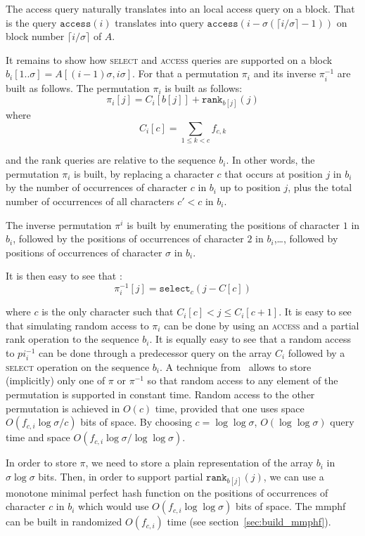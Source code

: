 \documentclass[a4paper]{article}
\begin{document}
The access query naturally translates into an local access query on a block. 
That is the query $\mathtt{access}(i)$ translates into query $\mathtt{access}(i-\sigma(\lceil i/\sigma\rceil-1))$ on block number $\lceil i/\sigma\rceil$ of $A$. 

It remains to show how \textsc{select} and \textsc{access} queries are supported on a block $b_i[1..\sigma]=A[(i-1)\sigma,i\sigma]$. For that a permutation $\pi_i$ and its inverse $\pi_i^{-1}$ are built as follows. The permutation $\pi_i$ is built as follows: $$\pi_i[j]=C_i[b[j]]+\mathtt{rank}_{b[j]}(j)$$ 
where $$C_i[c]=\sum_{1\leq k<c}{f_{c,k}}$$

and the rank queries are relative to the sequence $b_i$. In other words, the permutation $\pi_i$ is built, by replacing 
a character $c$ that occurs at position $j$ in $b_i$ by the number of occurrences of character $c$ in $b_i$ up to position $j$, 
plus the total number of occurrences of all characters $c'<c$ in $b_i$. 

The inverse permutation $\pi^{i}$ is built by enumerating the positions of character $1$ in $b_i$, followed by the positions 
of occurrences of character $2$ in $b_i$,\ldots, followed by positions of occurrences of character $\sigma$ in $b_i$. 

It is then easy to see that :
$$\pi^{-1}_i[j]=\mathtt{select}_{c}(j-C[c])$$ 

where $c$ is the only character such that $C_i[c]<j\leq C_i[c+1]$. 
It is easy to see that simulating random access to $\pi_i$ can be done by using an \textsc{access} and a partial rank operation to the sequence $b_i$. It is equally easy to see that a random access to $pi^{-1}_i$ can be done through a predecessor query on the array $C_i$ followed by a \textsc{select} operation on the sequence $b_i$. 
A technique from~\cite{munro2003succinct} allows to store (implicitly) 
only one of $\pi$ or $\pi^{-1}$ so that random access 
to any element of the permutation is supported in constant time. 
Random access to the other permutation is achieved in $O(c)$ time, provided 
that one uses space $O(f_{c,i}\log\sigma/c)$ bits of space. By choosing $c=\log\log\sigma$, 
$O(\log\log\sigma)$ query time and space $O(f_{c,i}\log\sigma/\log\log\sigma)$. 

In order to store $\pi$, we need to store a plain representation 
of the array $b_i$ in $\sigma\log\sigma$ bits. Then, in order 
to support partial $\mathtt{rank}_{b[j]}(j)$, we can use a monotone 
minimal perfect hash function on the positions 
of occurrences of character $c$ in $b_i$ 
which would use $O(f_{c,i}\log\log\sigma)$ bits of space. The mmphf 
can be built in randomized $O(f_{c,i})$ time (see section~\ref{sec:build_mmphf}). 
\end{document}
